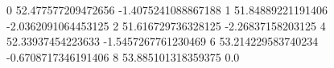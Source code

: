 0 52.477577209472656 -1.4075241088867188
1 51.84889221191406 -2.0362091064453125
2 51.616729736328125 -2.26837158203125
4 52.33937454223633 -1.5457267761230469
6 53.214229583740234 -0.6708717346191406
8 53.885101318359375 0.0
